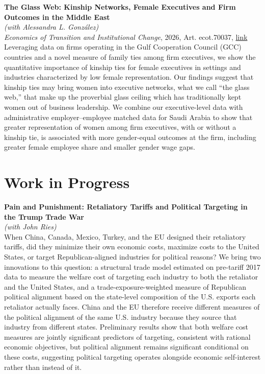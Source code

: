 \documentclass[11pt]{article}
\begin{document}
\bigskip
\noindent
\textbf{The Glass Web: Kinship Networks, Female Executives and Firm Outcomes in the Middle East} \\
\emph{(with Alessandra L. Gonz\'{a}lez)} \\
\emph{Economics of Transition and Institutional Change}, 2026, Art. ecot.70037, \href{https://doi.org/10.1111/ecot.70037}{link} \\
{\small Leveraging data on firms operating in the Gulf Cooperation Council (GCC) countries and a novel measure of family ties among firm executives, we show the quantitative importance of kinship ties for female executives in settings and industries characterized by low female representation. Our findings suggest that kinship ties may bring women into executive networks, what we call ``the glass web,'' that make up the proverbial glass ceiling which has traditionally kept women out of business leadership. We combine our executive-level data with administrative employer--employee matched data for Saudi Arabia to show that greater representation of women among firm executives, with or without a kinship tie, is associated with more gender-equal outcomes at the firm, including greater female employee share and smaller gender wage gaps.}

\section*{Work in Progress}
\textbf{Pain and Punishment: Retaliatory Tariffs and Political Targeting in the Trump Trade War} \\
\emph{(with John Ries)} \\
{\small When China, Canada, Mexico, Turkey, and the EU designed their retaliatory tariffs, did they minimize their own economic costs, maximize costs to the United States, or target Republican-aligned industries for political reasons? We bring two innovations to this question: a structural trade model estimated on pre-tariff 2017 data to measure the welfare cost of targeting each industry to both the retaliator and the United States, and a trade-exposure-weighted measure of Republican political alignment based on the state-level composition of the U.S. exports each retaliator actually faces. China and the EU therefore receive different measures of the political alignment of the same U.S. industry because they source that industry from different states. Preliminary results show that both welfare cost measures are jointly significant predictors of targeting, consistent with rational economic objectives, but political alignment remains significant conditional on these costs, suggesting political targeting operates alongside economic self-interest rather than instead of it.}
\end{document}
